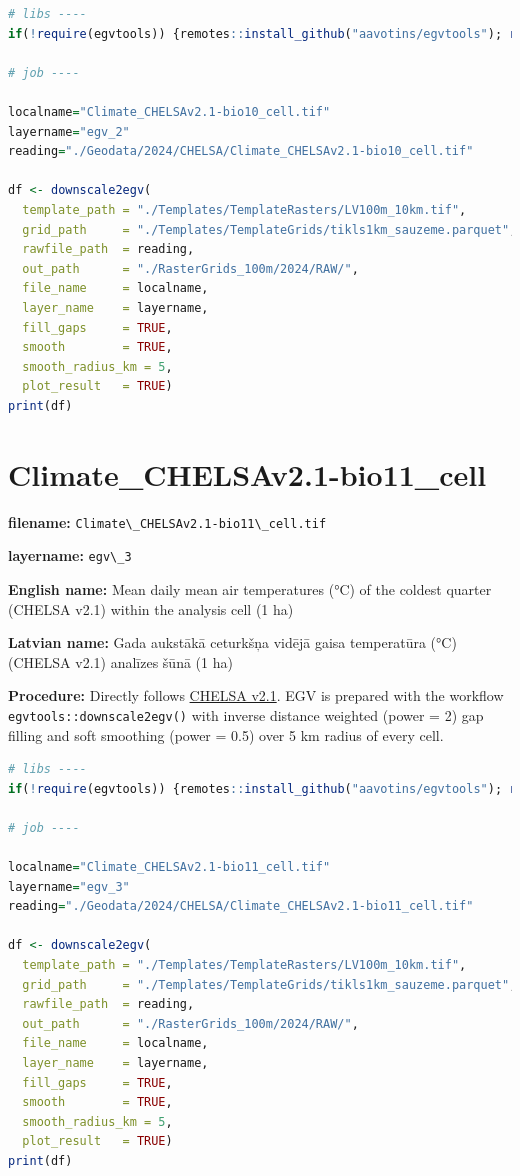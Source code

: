 \documentclass[
]{book}
\newcommand{\passthrough}[1]{#1}
\begin{document}
\begin{lstlisting}[language=R]
# libs ----
if(!require(egvtools)) {remotes::install_github("aavotins/egvtools"); require(egvtools)}

# job ----

localname="Climate_CHELSAv2.1-bio10_cell.tif"
layername="egv_2"
reading="./Geodata/2024/CHELSA/Climate_CHELSAv2.1-bio10_cell.tif"

df <- downscale2egv(
  template_path = "./Templates/TemplateRasters/LV100m_10km.tif",
  grid_path     = "./Templates/TemplateGrids/tikls1km_sauzeme.parquet",
  rawfile_path  = reading,
  out_path      = "./RasterGrids_100m/2024/RAW/",
  file_name     = localname,
  layer_name    = layername,
  fill_gaps     = TRUE,
  smooth        = TRUE,
  smooth_radius_km = 5,
  plot_result   = TRUE)
print(df)
\end{lstlisting}

\section{Climate\_CHELSAv2.1-bio11\_cell}\label{ch06.003}

\textbf{filename:} \passthrough{\lstinline!Climate\_CHELSAv2.1-bio11\_cell.tif!}

\textbf{layername:} \passthrough{\lstinline!egv\_3!}

\textbf{English name:} Mean daily mean air temperatures (°C) of the coldest quarter (CHELSA v2.1) within the analysis cell (1 ha)

\textbf{Latvian name:} Gada aukstākā ceturkšņa vidējā gaisa temperatūra (°C) (CHELSA v2.1) analīzes šūnā (1 ha)

\textbf{Procedure:} Directly follows \hyperref[Ch04.11]{CHELSA v2.1}. EGV is prepared with the
workflow \passthrough{\lstinline!egvtools::downscale2egv()!} with inverse distance weighted (power = 2)
gap filling and soft smoothing (power = 0.5) over 5 km radius of every cell.

\begin{lstlisting}[language=R]
# libs ----
if(!require(egvtools)) {remotes::install_github("aavotins/egvtools"); require(egvtools)}

# job ----

localname="Climate_CHELSAv2.1-bio11_cell.tif"
layername="egv_3"
reading="./Geodata/2024/CHELSA/Climate_CHELSAv2.1-bio11_cell.tif"

df <- downscale2egv(
  template_path = "./Templates/TemplateRasters/LV100m_10km.tif",
  grid_path     = "./Templates/TemplateGrids/tikls1km_sauzeme.parquet",
  rawfile_path  = reading,
  out_path      = "./RasterGrids_100m/2024/RAW/",
  file_name     = localname,
  layer_name    = layername,
  fill_gaps     = TRUE,
  smooth        = TRUE,
  smooth_radius_km = 5,
  plot_result   = TRUE)
print(df)
\end{lstlisting}
\end{document}
